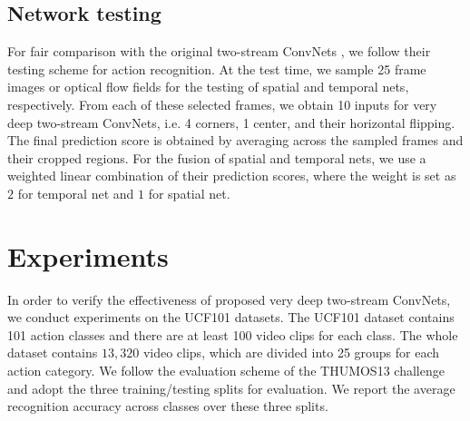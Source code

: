 \documentclass[10pt,twocolumn,letterpaper]{article}
\begin{document}
\begin{table*}
\begin{center}
\vspace{2mm}
\caption{Performance comparison of different architectures on the THUMOS15 \cite{THUMOS15} validation dataset from \cite{WangWXQ15}.}
\label{tbl:result_thumos}
\end{center}
\end{table*}

\subsection{Network testing}

For fair comparison with the original two-stream ConvNets \cite{SimonyanZ14}, we follow their testing scheme for action recognition. At the test time, we sample 25 frame images or optical flow fields for the testing of spatial and temporal nets, respectively. From each of these selected frames, we obtain 10 inputs for very deep two-stream ConvNets, i.e. 4 corners, 1 center, and their horizontal flipping. The final prediction score is obtained by averaging across the sampled frames and their cropped regions. For the fusion of spatial and temporal nets, we use a weighted linear combination of their prediction scores, where the weight is set as $2$ for temporal net and $1$ for spatial net.

\section{Experiments}
\label{sec:experiment}

In order to verify the effectiveness of proposed very deep two-stream ConvNets, we conduct experiments on the UCF101 \cite{Soomro12} datasets. The UCF101 dataset contains 101 action classes and there are at least 100 video clips for each class. The whole dataset contains $13,320$ video clips, which are divided into 25 groups for each action category. We follow the evaluation scheme of the THUMOS13 challenge \cite{THUMOS13} and adopt the three training/testing splits for evaluation. We report the average recognition accuracy across classes over these three splits.
\end{document}
